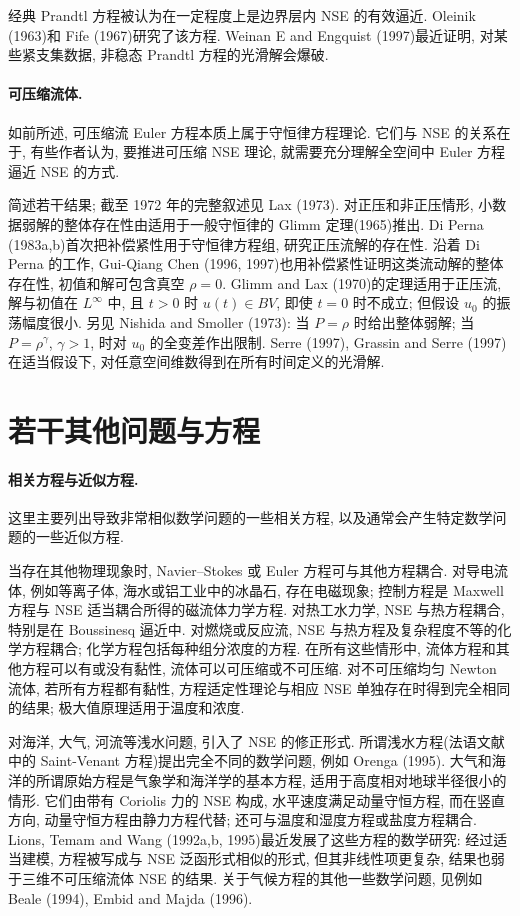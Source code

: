 经典 Prandtl 方程被认为在一定程度上是边界层内 NSE 的有效逼近. Oleinik (1963)和 Fife (1967)研究了该方程. Weinan E and Engquist (1997)最近证明, 对某些紧支集数据, 非稳态 Prandtl 方程的光滑解会爆破.

\hypertarget{appendix-03-page-373}{}
\paragraph{可压缩流体.}
如前所述, 可压缩流 Euler 方程本质上属于守恒律方程理论. 它们与 NSE 的关系在于, 有些作者认为, 要推进可压缩 NSE 理论, 就需要充分理解全空间中 Euler 方程逼近 NSE 的方式.

简述若干结果; 截至 1972 年的完整叙述见 Lax (1973). 对正压和非正压情形, 小数据弱解的整体存在性由适用于一般守恒律的 Glimm 定理(1965)推出. Di Perna (1983a,b)首次把补偿紧性用于守恒律方程组, 研究正压流解的存在性. 沿着 Di Perna 的工作, Gui-Qiang Chen (1996, 1997)也用补偿紧性证明这类流动解的整体存在性, 初值和解可包含真空 $\rho=0$. Glimm and Lax (1970)的定理适用于正压流, 解与初值在 $L^\infty$ 中, 且 $t>0$ 时 $u(t)\in BV$, 即使 $t=0$ 时不成立; 但假设 $u_0$ 的振荡幅度很小. 另见 Nishida and Smoller (1973): 当 $P=\rho$ 时给出整体弱解; 当 $P=\rho^\gamma$, $\gamma>1$, 时对 $u_0$ 的全变差作出限制. Serre (1997), Grassin and Serre (1997)在适当假设下, 对任意空间维数得到在所有时间定义的光滑解.

\section{若干其他问题与方程}
\label{sec:app3-other-problems}

\paragraph{相关方程与近似方程.}
这里主要列出导致非常相似数学问题的一些相关方程, 以及通常会产生特定数学问题的一些近似方程.

当存在其他物理现象时, Navier--Stokes 或 Euler 方程可与其他方程耦合. 对导电流体, 例如等离子体, 海水或铝工业中的冰晶石, 存在电磁现象; 控制方程是 Maxwell 方程与 NSE 适当耦合所得的磁流体力学方程. 对热工水力学, NSE 与热方程耦合, 特别是在 Boussinesq 逼近中. 对燃烧或反应流, NSE 与热方程及复杂程度不等的化学方程耦合; 化学方程包括每种组分浓度的方程. 在所有这些情形中, 流体方程和其他方程可以有或没有黏性, 流体可以可压缩或不可压缩. 对不可压缩均匀 Newton 流体, 若所有方程都有黏性, 方程适定性理论与相应 NSE 单独存在时得到完全相同的结果; 极大值原理适用于温度和浓度.

对海洋, 大气, 河流等浅水问题, 引入了 NSE 的修正形式. 所谓浅水方程(法语文献中的 Saint-Venant 方程)提出完全不同的数学问题, 例如 Orenga (1995). 大气和海洋的所谓原始方程是气象学和海洋学的基本方程, 适用于高度相对地球半径很小的情形. 它们由带有 Coriolis 力的 NSE 构成, 水平速度满足动量守恒方程, 而在竖直方向, 动量守恒方程由静力方程代替; 还可与温度和湿度方程或盐度方程耦合. Lions, Temam and Wang (1992a,b, 1995)最近发展了这些方程的数学研究: 经过适当建模, 方程被写成与 NSE 泛函形式相似的形式, 但其非线性项更复杂, 结果也弱于三维不可压缩流体 NSE 的结果. 关于气候方程的其他一些数学问题, 见例如 Beale (1994), Embid and Majda (1996).

